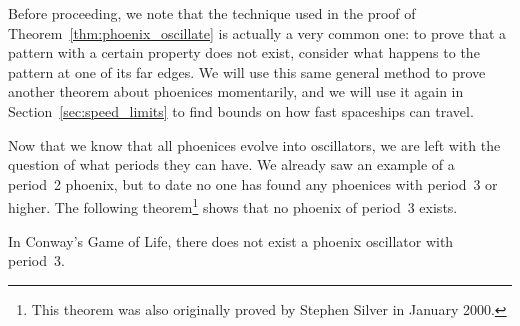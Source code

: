 Before proceeding, we note that the technique used in the proof of Theorem~\ref{thm:phoenix_oscillate} is actually a very common one: to prove that a pattern with a certain property does not exist, consider what happens to the pattern at one of its far edges. We will use this same general method to prove another theorem about phoenices momentarily, and we will use it again in Section~\ref{sec:speed_limits} to find bounds on how fast spaceships can travel.

Now that we know that all phoenices evolve into oscillators, we are left with the question of what periods they can have. We already saw an example of a period~2 phoenix, but to date no one has found any phoenices with period~3 or higher. The following theorem\footnote{This theorem was also originally proved by Stephen Silver in January 2000.} shows that no phoenix of period~3 exists.

\begin{theorem}\label{thm:phoenix_p3}
	In Conway's Game of Life, there does not exist a phoenix oscillator with period~3.
\end{theorem}

